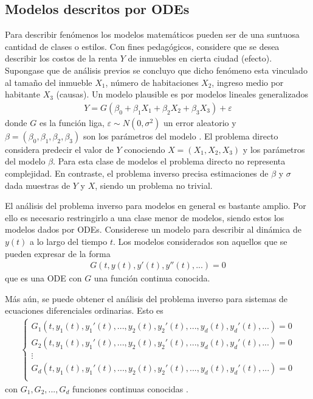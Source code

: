 \subsection*{Modelos descritos por ODEs}

Para describir fenómenos los modelos matemáticos pueden ser de una suntuosa cantidad de clases o estilos. Con fines pedagógicos, considere que se desea describir los costos de la renta $Y$ de inmuebles en cierta ciudad (efecto). Supongase que de análisis previos se concluyo que dicho fenómeno esta vinculado al tamaño del inmueble $X_1$, número de habitaciones $X_2$, ingreso medio por habitante $X_3$ (causas). Un modelo plausible es por modelos lineales generalizados
\begin{align}
    Y = G(\beta_0 + \beta_1 X_1 + \beta_2 X_2 + \beta_3 X_3) + \varepsilon
    \label{2.1.1.01}
\end{align}
donde $G$ es la función liga, $\varepsilon \sim N(0,\sigma^2)$ un error aleatorio y $\beta = (\beta_0, \beta_1, \beta_2, \beta_3)$ son los parámetros del modelo \cite{dobson2018introduction}. El problema directo considera predecir el valor de $Y$ conociendo $X = (X_1,X_2,X_3)$ y los parámetros del modelo $\beta$. Para esta clase de modelos el problema directo no representa complejidad. En contraste, el problema inverso precisa estimaciones de $\beta$  y $\sigma$ dada muestras de $Y$ y $X$, siendo un problema no trivial. 

El análisis del problema inverso para modelos en general es bastante amplio. Por ello es necesario restringirlo a una clase menor de modelos, siendo estos los modelos dados por ODEs. Considerese un modelo para describir al dinámica de $y(t)$ a lo largo del tiempo $t$. Los modelos considerados son aquellos que se pueden expresar de la forma
\begin{align*}
    G(t,y(t),y'(t),y''(t),...) = 0
\end{align*}
que es una ODE con $G$ una función continua conocida.

Más aún, se puede obtener el análisis del problema inverso para sistemas de ecuaciones diferenciales ordinarias. Esto es
\begin{align*}
    \left\{
        \begin{matrix}
        G_1(t,y_1(t),y_1'(t),...,y_2(t),y_2'(t),..., y_d(t),y_d'(t),...)=0\\
        G_2(t,y_1(t),y_1'(t),...,y_2(t),y_2'(t),..., y_d(t),y_d'(t),...)=0\\
        \vdots
        \\ 
        G_d(t,y_1(t),y_1'(t),...,y_2(t),y_2'(t),..., y_d(t),y_d'(t),...)=0\\
       \end{matrix}
    \right.
\end{align*}
con $G_1, G_2, ..., G_d$ funciones continuas conocidas \cite{zill2002ecuaciones}.

